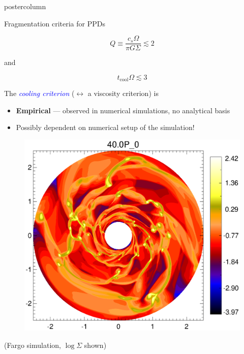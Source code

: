 \documentclass[final,hyperref={pdfpagelabels=false}]{beamer}
\begin{document}
\begin{frame}
\begin{columns}
\begin{column}{.49\textwidth}
\begin{beamercolorbox}[center,wd=\textwidth]{postercolumn}
\begin{minipage}[T]{.95\textwidth}
{            
            \begin{block}{{\Large Fragmentation criteria for PPDs}}
              \justifying
              \begin{center}
                \begin{onlinebox}{6.5cm}
                  \[ Q\equiv\frac{c_s\Omega}{\pi G \Sigma}\lesssim 2\] 
                \end{onlinebox}
                and
                \begin{onlinebox}{4.5cm}
                  \[t_\mathrm{cool}\Omega\lesssim 3\]
                \end{onlinebox}
              \end{center}
              The \textcolor{blue}{\it cooling criterion} ($\leftrightarrow$ a viscosity criterion) is   
              \begin{itemize}
              \item {\bf Empirical} --- observed in numerical
                simulations,  no analytical basis
              \item Possibly dependent on numerical setup of the simulation!
              \end{itemize}
              \begin{figure}
                \includegraphics[width=\linewidth,clip=true,trim=0cm 0cm 0cm 0.6cm]{figures/disk_frag1}
              \end{figure}
            (Fargo simulation, $\log \Sigma$ shown)
            \end{block}
            
}
\end{minipage}
\end{beamercolorbox}
\end{column}
\end{columns}
\end{frame}
\end{document}
